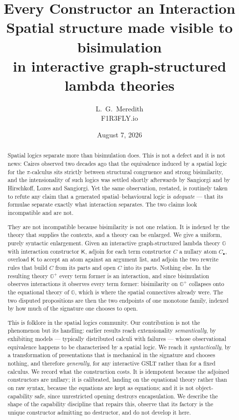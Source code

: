 \documentclass[11pt]{article}
\title{\bfseries Every Constructor an Interaction\\[.35em]
\large Spatial structure made visible to bisimulation\\
in interactive graph-structured lambda theories}
\author{L.\ G.\ Meredith\\ \small F1R3FLY.io}
\date{August 7, 2026}
\theoremstyle{plain}
\theoremstyle{definition}
\newcommand{\Kc}{\mathsf{K}}
\newcommand{\Gg}{\mathbb{G}}
\begin{document}
\maketitle

\begin{abstract}
Spatial logics separate more than bisimulation does. This is not a defect and it is not news: Caires
observed two decades ago that the equivalence induced by a spatial logic for the $\pi$-calculus sits
strictly between structural congruence and strong bisimilarity, and the intensionality of such logics
was settled shortly afterwards by Sangiorgi and by Hirschkoff, Lozes and Sangiorgi. Yet the same
observation, restated, is routinely taken to refute any claim that a generated spatial--behavioural
logic is \emph{adequate} --- that its formulae separate exactly what interaction separates. The two
claims look incompatible and are not.

They are not incompatible because bisimilarity is not one relation. It is indexed by the theory that
supplies the contexts, and a theory can be enlarged. We give a uniform, purely syntactic enlargement.
Given an interactive graph-structured lambda theory $\Gg$ with interaction constructor $\Kc$, adjoin
for each term constructor $C$ a nullary atom $C_\bullet$, overload $\Kc$ to accept an atom against an
argument list, and adjoin the two rewrite rules that build $C$ from its parts and open $C$ into its
parts. Nothing else. In the resulting theory $\Gg^+$ every term former is an interaction, and since
bisimulation observes interactions it observes every term former: bisimilarity on $\Gg^+$ collapses
onto the equational theory of $\Gg$, which is where the spatial connectives already were. The two
disputed propositions are then the two endpoints of one monotone family, indexed by how much of the
signature one chooses to open.

This is folklore in the spatial logics community. Our contribution is not the phenomenon but its
handling: earlier results reach extensionality \emph{semantically}, by exhibiting models --- typically
distributed calculi with failures --- whose observational equivalence happens to be characterised by
a spatial logic. We reach it \emph{syntactically}, by a transformation of presentations that is
mechanical in the signature and chooses nothing, and therefore \emph{generally}, for any interactive
GSLT rather than for a fixed calculus. We record what the construction costs. It is idempotent
because the adjoined constructors are nullary; it is calibrated, landing on the equational theory
rather than on raw syntax, because the equations are kept as equations; and it is not
object-capability safe, since unrestricted opening destroys encapsulation. We describe the shape of
the capability discipline that repairs this, observe that its factory is the unique constructor
admitting no destructor, and do not develop it here.
\end{abstract}
\end{document}
